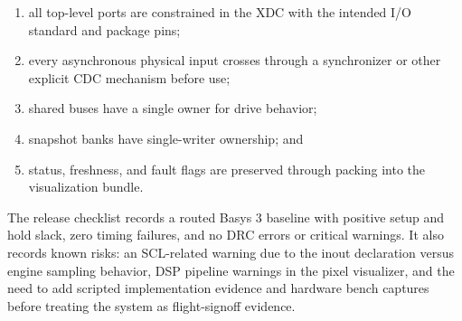 \documentclass[11pt]{article}
\begin{document}
\begin{enumerate}[leftmargin=*]
  \item all top-level ports are constrained in the XDC with the intended I/O
        standard and package pins;
  \item every asynchronous physical input crosses through a synchronizer or
        other explicit CDC mechanism before use;
  \item shared buses have a single owner for drive behavior;
  \item snapshot banks have single-writer ownership; and
  \item status, freshness, and fault flags are preserved through packing into
        the visualization bundle.
\end{enumerate}

The release checklist records a routed Basys 3 baseline with positive setup and
hold slack, zero timing failures, and no DRC errors or critical warnings.  It
also records known risks: an SCL-related warning due to the inout declaration
versus engine sampling behavior, DSP pipeline warnings in the pixel visualizer,
and the need to add scripted implementation evidence and hardware bench
captures before treating the system as flight-signoff evidence.
\end{document}
